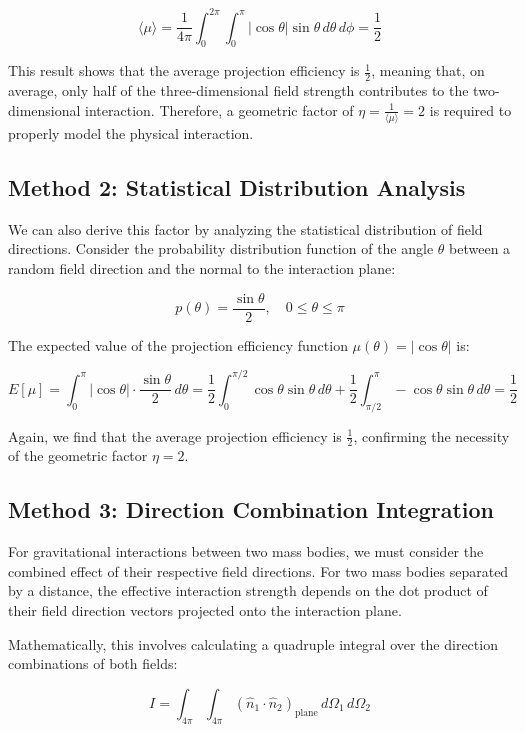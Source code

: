 \documentclass[nature,numbers]{article}
\begin{document}
$$\langle \mu \rangle = \frac{1}{4\pi} \int_0^{2\pi} \int_0^\pi |\cos\theta| \sin\theta \, d\theta \, d\phi = \frac{1}{2}$$

This result shows that the average projection efficiency is $\frac{1}{2}$, meaning that, on average, only half of the three-dimensional field strength contributes to the two-dimensional interaction. Therefore, a geometric factor of $\eta = \frac{1}{\langle \mu \rangle} = 2$ is required to properly model the physical interaction.

\subsection{Method 2: Statistical Distribution Analysis}

We can also derive this factor by analyzing the statistical distribution of field directions. Consider the probability distribution function of the angle $\theta$ between a random field direction and the normal to the interaction plane:

$$p(\theta) = \frac{\sin\theta}{2}, \quad 0 \leq \theta \leq \pi$$

The expected value of the projection efficiency function $\mu(\theta) = |\cos\theta|$ is:

$$E[\mu] = \int_0^\pi |\cos\theta| \cdot \frac{\sin\theta}{2} \, d\theta = \frac{1}{2} \int_0^{\pi/2} \cos\theta \sin\theta \, d\theta + \frac{1}{2} \int_{\pi/2}^\pi -\cos\theta \sin\theta \, d\theta = \frac{1}{2}$$

Again, we find that the average projection efficiency is $\frac{1}{2}$, confirming the necessity of the geometric factor $\eta = 2$.

\subsection{Method 3: Direction Combination Integration}

For gravitational interactions between two mass bodies, we must consider the combined effect of their respective field directions. For two mass bodies separated by a distance, the effective interaction strength depends on the dot product of their field direction vectors projected onto the interaction plane.

Mathematically, this involves calculating a quadruple integral over the direction combinations of both fields:

$$I = \int_{4\pi} \int_{4\pi} (\hat{n}_1 \cdot \hat{n}_2)_{\text{plane}} \, d\Omega_1 \, d\Omega_2$$
\end{document}
